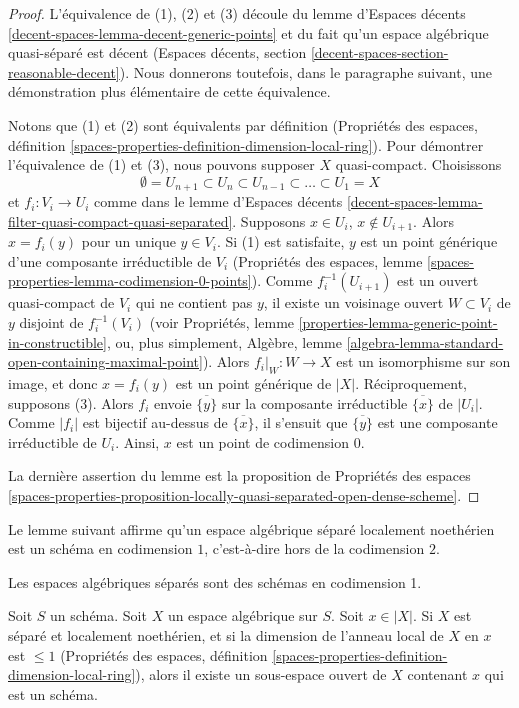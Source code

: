 \begin{proof}
L'équivalence de (1), (2) et (3) découle du
lemme d'Espaces décents \ref{decent-spaces-lemma-decent-generic-points}
et du fait qu'un espace algébrique quasi-séparé est décent
(Espaces décents, section \ref{decent-spaces-section-reasonable-decent}).
Nous donnerons toutefois, dans le paragraphe suivant, une démonstration plus
élémentaire de cette équivalence.

\medskip\noindent
Notons que (1) et (2) sont équivalents par définition
(Propriétés des espaces, définition
\ref{spaces-properties-definition-dimension-local-ring}).
Pour démontrer l'équivalence de (1) et (3), nous pouvons supposer $X$ quasi-compact.
Choisissons
$$
\emptyset = U_{n + 1} \subset
U_n \subset U_{n - 1} \subset \ldots \subset U_1 = X
$$
et $f_i : V_i \to U_i$ comme dans le lemme d'Espaces décents
\ref{decent-spaces-lemma-filter-quasi-compact-quasi-separated}.
Supposons $x \in U_i$, $x \not \in U_{i + 1}$. Alors $x = f_i(y)$ pour
un unique $y \in V_i$. Si (1) est satisfaite, $y$ est un point générique
d'une composante irréductible de $V_i$ (Propriétés des espaces, lemme
\ref{spaces-properties-lemma-codimension-0-points}).
Comme $f_i^{-1}(U_{i + 1})$ est un ouvert quasi-compact de $V_i$
qui ne contient pas $y$, il existe un voisinage ouvert $W \subset V_i$
de $y$ disjoint de $f_i^{-1}(V_i)$
(voir
Propriétés, lemme \ref{properties-lemma-generic-point-in-constructible},
ou, plus simplement, Algèbre, lemme
\ref{algebra-lemma-standard-open-containing-maximal-point}).
Alors $f_i|_W : W \to X$ est un isomorphisme sur son image, et donc
$x = f_i(y)$ est un point générique de $|X|$. Réciproquement, supposons (3).
Alors $f_i$ envoie $\overline{\{y\}}$ sur la composante irréductible
$\overline{\{x\}}$ de $|U_i|$. Comme $|f_i|$ est bijectif au-dessus de
$\overline{\{x\}}$, il s'ensuit que $\overline{\{y\}}$
est une composante irréductible de $U_i$. Ainsi, $x$ est un point de
codimension $0$.

\medskip\noindent
La dernière assertion du lemme est la
proposition de Propriétés des espaces
\ref{spaces-properties-proposition-locally-quasi-separated-open-dense-scheme}.
\end{proof}

\noindent
Le lemme suivant affirme qu'un espace algébrique séparé localement noethérien
est un schéma en codimension $1$, c'est-à-dire hors de la codimension $2$.

\begin{lemma}
\label{lemma-codim-1-point-in-schematic-locus}
\begin{slogan}
Les espaces algébriques séparés sont des schémas en codimension 1.
\end{slogan}
Soit $S$ un schéma. Soit $X$ un espace algébrique sur $S$.
Soit $x \in |X|$. Si $X$ est séparé et localement noethérien, et si
la dimension de l'anneau local de $X$ en $x$ est $\leq 1$
(Propriétés des espaces, définition
\ref{spaces-properties-definition-dimension-local-ring}),
alors il existe un sous-espace ouvert de $X$ contenant $x$ qui est un schéma.
\end{lemma}


